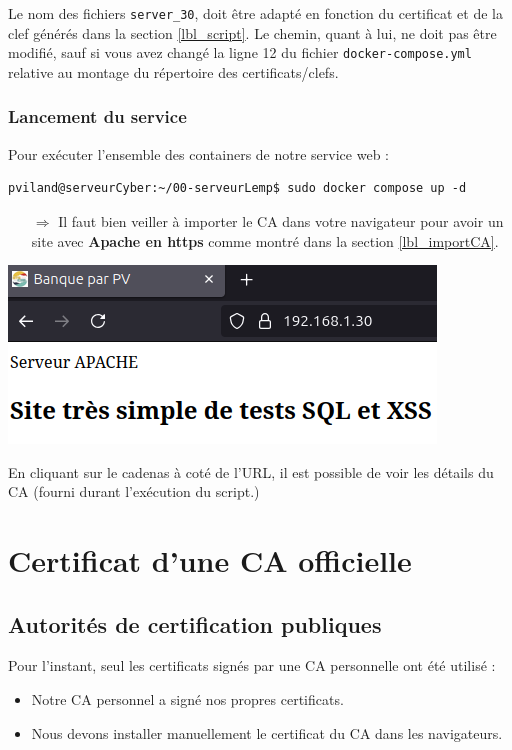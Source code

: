 \documentclass[french, 12pt]{article}%
\newcommand{\itemE}{\item[$\bullet$]}
\begin{document}
Le nom des fichiers \verb?server_30?, doit être adapté en fonction du certificat et de la clef générés dans la section \ref{lbl_script}. Le chemin, quant à lui, ne doit pas être modifié, sauf si vous avez changé la ligne 12 du fichier \verb?docker-compose.yml? relative au montage du répertoire des certificats/clefs.


\subsubsection{Lancement du service}

Pour exécuter l'ensemble des containers de notre service web : 
\begin{lstlisting}[style=commande]
pviland@serveurCyber:~/00-serveurLemp$ sudo docker compose up -d
\end{lstlisting}


\begin{itemize}
\item[$\Rightarrow$] Il faut bien veiller à importer le CA dans votre navigateur pour avoir un site avec \textbf{Apache en https} comme montré dans la section \ref{lbl_importCA}.
\end{itemize}


\begin{center}
\includegraphics[scale=0.7]{./ressource/apacheHttps}
\end{center}

En cliquant sur le cadenas à coté de l'URL, il est possible de voir les détails du CA (fourni durant l'exécution du script.)



\section{Certificat d'une CA officielle}

\subsection{Autorités de certification publiques }
Pour l'instant, seul les certificats signés par une CA personnelle ont été utilisé : 
\begin{itemize}
\itemE Notre CA personnel a signé nos propres certificats. 
\itemE Nous devons installer manuellement le certificat du CA dans les navigateurs.
\end{itemize} 
\end{document}
